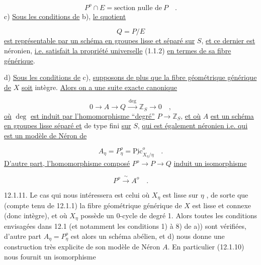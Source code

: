 \begin{equation}\tag{12.1.6}
P^o \cap E = \underline{\mbox{section nulle de}}\ P
\quad .
\end{equation}
c) \underline{Sous les conditions de} b), \underline{le quotient}

\begin{equation}\tag{12.1.7}
Q = P/E
\end{equation}
\underline{est représentable par un schéma en groupes lisse et séparé sur} $S$, \underline{et ce dernier est} néronien, \underline{i.e. satisfait la propriété universelle} (1.1.2) \underline{en termes de sa fibre générique}.

d) \underline{Sous les conditions de} c), \underline{supposons de plus que la fibre géométrique générique de} $X$ \underline{soit} intègre. \underline{Alors on a une suite exacte canonique}

\begin{equation}\tag{12.1.8}
0 \longrightarrow A \longrightarrow Q \xrightarrow{\ \deg\ } \mathbb{Z}_S \longrightarrow 0 \quad ,
\end{equation}
\underline{où} $\deg$ \underline{est induit par l'homomorphisme ``degré''} $P \longrightarrow \mathbb{Z}_S$, \underline{et où} $A$ \underline{est un schéma en groupes lisse séparé et} de type fini \underline{sur} $S$, \underline{qui est également néronien i.e. qui est un modèle de Néron de}

\begin{equation}\tag{12.1.9}
A_\eta = P_\eta^o = \underline{\mathrm{Pic}}^o_{X_\eta/\eta} \quad .
\end{equation}
\underline{D'autre part, l'homomorphisme composé} $P^o \longrightarrow P \to Q$ \underline{induit un isomorphisme}

\begin{equation}\tag{12.1.10}
P^o \xrightarrow{\ \sim\ } A^o \quad .
\end{equation}


12.1.11. Le cas qui nous intéressera est celui où $X_\eta$ est lisse sur $\eta$ , de sorte que (compte tenu de 12.1.1) la fibre géométrique générique de $X$ est lisse et connexe (donc intègre), et où $X_\eta$ possède un $0$-cycle de degré 1. Alors toutes les conditions envisagées dans 12.1 (et notamment les conditions 1) à 8) de a)) sont vérifiées, d'autre part $A_\eta = P_\eta^o$ est alors un schéma abélien, et d) nous donne une construction très explicite de son modèle de Néron $A$. En particulier (12.1.10) nous fournit un isomorphisme

